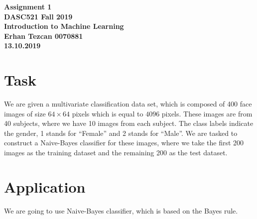 \documentclass[12pt,reqno]{amsart}
\begin{document}
\begin{center}
\large\textbf{Assignment 1 \\ DASC521 Fall 2019} \\
\normalsize\textbf{Introduction to Machine Learning \\  Erhan Tezcan 0070881 \\ 13.10.2019} \\
\end{center}

\section{Task}
We are given a multivariate classification data set, which is composed of 400 face images of size $64\times64$ pixels which is equal to $4096$ pixels. These images are from 40 subjects, where
we have 10 images from each subject. The class labels indicate the gender, 1 stands for ``Female'' and 2 stands for ``Male''. We are tasked to construct a Naive-Bayes classifier for these images, where we take the first 200 images as the training dataset and the remaining 200 as the test dataset.

\section{Application}
We are going to use Naive-Bayes classifier, which is based on the Bayes rule.
\end{document}
